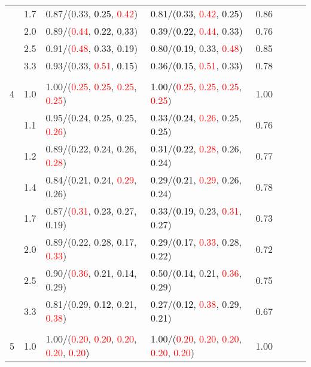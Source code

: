 \documentclass[10pt,a4paper]{report}
\begin{document}
\begin{table}[!htbp]
\begin{center}
{\begin{tabular}{ccllcccc}
			&1.7&0.87/(0.33, \textcolor{black}{0.25}, \textcolor{red}{0.42})&0.81/(0.33, \textcolor{red}{0.42}, \textcolor{black}{0.25})&0.86\\
			&2.0&0.89/(\textcolor{red}{0.44}, \textcolor{black}{0.22}, 0.33)&0.39/(\textcolor{black}{0.22}, \textcolor{red}{0.44}, 0.33)&0.76\\
			&2.5&0.91/(\textcolor{red}{0.48}, 0.33, \textcolor{black}{0.19})&0.80/(\textcolor{black}{0.19}, 0.33, \textcolor{red}{0.48})&0.85\\
			&3.3&0.93/(0.33, \textcolor{red}{0.51}, \textcolor{black}{0.15})&0.36/(\textcolor{black}{0.15}, \textcolor{red}{0.51}, 0.33)&0.78\\
			&&&&\\
			4			&1.0&1.00/(\textcolor{red}{0.25}, \textcolor{red}{0.25}, \textcolor{red}{0.25}, \textcolor{red}{0.25})&1.00/(\textcolor{red}{0.25}, \textcolor{red}{0.25}, \textcolor{red}{0.25}, \textcolor{red}{0.25})&1.00\\
			&1.1&0.95/(\textcolor{black}{0.24}, 0.25, 0.25, \textcolor{red}{0.26})&0.33/(\textcolor{black}{0.24}, \textcolor{red}{0.26}, 0.25, 0.25)&0.76\\
			&1.2&0.89/(\textcolor{black}{0.22}, 0.24, 0.26, \textcolor{red}{0.28})&0.31/(\textcolor{black}{0.22}, \textcolor{red}{0.28}, 0.26, 0.24)&0.77\\
			&1.4&0.84/(\textcolor{black}{0.21}, 0.24, \textcolor{red}{0.29}, 0.26)&0.29/(\textcolor{black}{0.21}, \textcolor{red}{0.29}, 0.26, 0.24)&0.78\\
			&1.7&0.87/(\textcolor{red}{0.31}, 0.23, 0.27, \textcolor{black}{0.19})&0.33/(\textcolor{black}{0.19}, 0.23, \textcolor{red}{0.31}, 0.27)&0.73\\
			&2.0&0.89/(0.22, 0.28, \textcolor{black}{0.17}, \textcolor{red}{0.33})&0.29/(\textcolor{black}{0.17}, \textcolor{red}{0.33}, 0.28, 0.22)&0.72\\
			&2.5&0.90/(\textcolor{red}{0.36}, 0.21, \textcolor{black}{0.14}, 0.29)&0.50/(\textcolor{black}{0.14}, 0.21, \textcolor{red}{0.36}, 0.29)&0.75\\
			&3.3&0.81/(0.29, \textcolor{black}{0.12}, 0.21, \textcolor{red}{0.38})&0.27/(\textcolor{black}{0.12}, \textcolor{red}{0.38}, 0.29, 0.21)&0.67\\
			&&&&\\
			5			&1.0&1.00/(\textcolor{red}{0.20}, \textcolor{red}{0.20}, \textcolor{red}{0.20}, \textcolor{red}{0.20}, \textcolor{red}{0.20})&1.00/(\textcolor{red}{0.20}, \textcolor{red}{0.20}, \textcolor{red}{0.20}, \textcolor{red}{0.20}, \textcolor{red}{0.20})&1.00\\

\end{tabular}}
\end{center}
\end{table}
\end{document}
